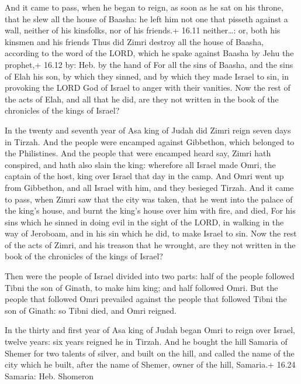 And it came to pass, when he began to reign, as soon as
he sat on his throne, that he slew all the house of Baasha: he left him
not one that pisseth against a wall, neither of his kinsfolks, nor of
his friends.+ 16.11 neither\ldots: or, both his kinsmen and his friends
 Thus did Zimri destroy all the house of Baasha, according
to the word of the LORD, which he spake against Baasha by Jehu the
prophet,+ 16.12 by: Heb. by the hand of  For all the sins
of Baasha, and the sins of Elah his son, by which they sinned, and by
which they made Israel to sin, in provoking the LORD God of Israel to
anger with their vanities.  Now the rest of the acts of
Elah, and all that he did, are they not written in the book of the
chronicles of the kings of Israel?

 In the twenty and seventh year of Asa king of Judah did
Zimri reign seven days in Tirzah. And the people were encamped against
Gibbethon, which belonged to the Philistines.  And the
people that were encamped heard say, Zimri hath conspired, and hath also
slain the king: wherefore all Israel made Omri, the captain of the host,
king over Israel that day in the camp.  And Omri went up
from Gibbethon, and all Israel with him, and they besieged Tirzah.
 And it came to pass, when Zimri saw that the city was
taken, that he went into the palace of the king's house, and burnt the
king's house over him with fire, and died,  For his sins
which he sinned in doing evil in the sight of the LORD, in walking in
the way of Jeroboam, and in his sin which he did, to make Israel to sin.
 Now the rest of the acts of Zimri, and his treason that he
wrought, are they not written in the book of the chronicles of the kings
of Israel?

 Then were the people of Israel divided into two parts:
half of the people followed Tibni the son of Ginath, to make him king;
and half followed Omri.  But the people that followed Omri
prevailed against the people that followed Tibni the son of Ginath: so
Tibni died, and Omri reigned.

 In the thirty and first year of Asa king of Judah began
Omri to reign over Israel, twelve years: six years reigned he in Tirzah.
 And he bought the hill Samaria of Shemer for two talents
of silver, and built on the hill, and called the name of the city which
he built, after the name of Shemer, owner of the hill, Samaria.+ 16.24
Samaria: Heb. Shomeron

